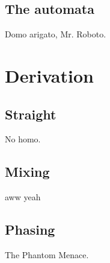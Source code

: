 \subsection{The automata}

Domo arigato, Mr. Roboto.

\section{Derivation}

\subsection{Straight}

No homo.

\subsection{Mixing}

aww yeah

\subsection{Phasing}

The Phantom Menace.
